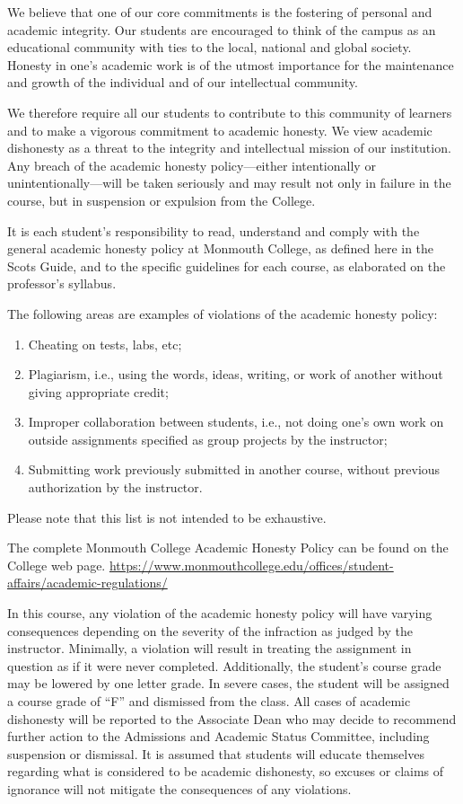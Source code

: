 \documentclass[10pt]{article}
\begin{document}
We believe that one of our core commitments is the fostering of personal and academic integrity. Our students are encouraged to think of the campus as an educational community with ties to the local, national and global society. Honesty in one’s academic work is of the utmost importance for the maintenance and growth of the individual and of our intellectual community.

We therefore require all our students to contribute to this community of learners and to make a vigorous commitment to academic honesty. We view academic dishonesty as a threat to the integrity and intellectual mission of our institution. Any breach of the academic honesty policy—either intentionally or unintentionally—will be taken seriously and may result not only in failure in the course, but in suspension or expulsion from the College.

It is each student's responsibility to read, understand and comply with the general academic honesty policy at Monmouth College, as defined here in the Scots Guide, and to the specific guidelines for each course, as elaborated on the professor's syllabus.

The following areas are examples of violations of the academic honesty policy:
\begin{enumerate}
  \item Cheating on tests, labs, etc;
  \item Plagiarism, i.e., using the words, ideas, writing, or work of another without giving appropriate credit;
  \item Improper collaboration between students, i.e., not doing one’s own work on outside assignments specified as group projects by the instructor;
  \item Submitting work previously submitted in another course, without previous authorization by the instructor.  
\end{enumerate}

Please note that this list is not intended to be exhaustive.

The complete Monmouth College Academic Honesty Policy can be found on the College web page. \url{https://www.monmouthcollege.edu/offices/student-affairs/academic-regulations/}

In this course, any violation of the academic honesty policy will have varying consequences depending on the severity of the infraction as judged by the instructor. Minimally, a violation will result in treating the assignment in question as if it were never completed. Additionally, the student's course grade may be lowered by one letter grade. In severe cases, the student will be assigned a course grade of ``F'' and dismissed from the class. All cases of academic dishonesty will be reported to the Associate Dean who may decide to recommend further action to the Admissions and Academic Status Committee, including suspension or dismissal. It is assumed that students will educate themselves regarding what is considered to be academic dishonesty, so excuses or claims of ignorance will not mitigate the consequences of any violations.
\end{document}

